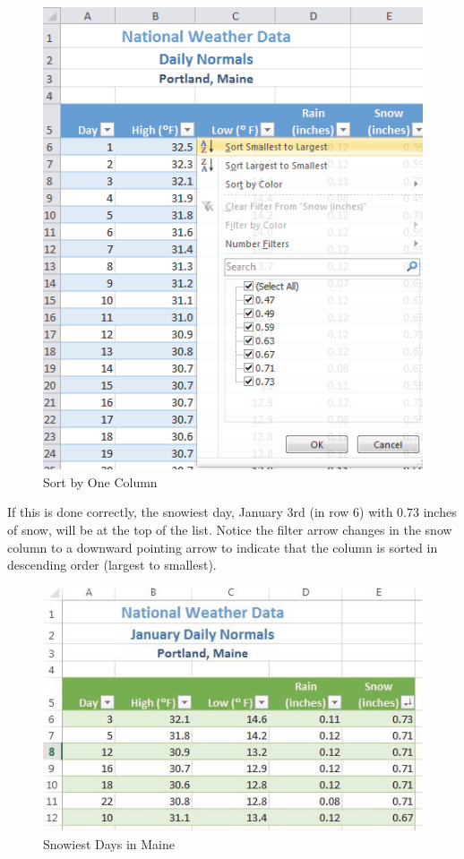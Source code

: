 \begin{figure}[H]
	\centering
	\includegraphics[width=\maxwidth{.95\linewidth}]{gfx/ch05_fig08}
	\caption{Sort by One Column}
	\label{05:fig08}
\end{figure}

If this is done correctly, the snowiest day, January 3rd (in row $ 6 $) with $ 0.73 $ inches of snow, will be at the top of the list. Notice the filter arrow changes in the snow column to a downward pointing arrow to indicate that the column is sorted in descending order (largest to smallest).

\begin{figure}[H]
	\centering
	\includegraphics[width=\maxwidth{.95\linewidth}]{gfx/ch05_fig09}
	\caption{Snowiest Days in Maine}
	\label{05:fig09}
\end{figure}

